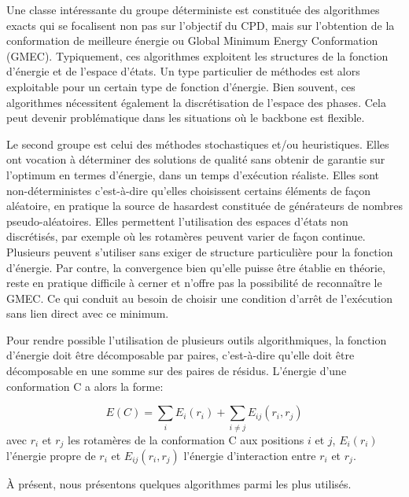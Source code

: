 Une classe intéressante du groupe déterministe est constituée des algorithmes exacts qui se focalisent non pas sur l'objectif du CPD, mais sur l'obtention de la conformation de meilleure énergie ou \og Global Minimum Energy Conformation \fg (GMEC). Typiquement, ces algorithmes exploitent les structures de la fonction d'énergie et de l'espace d'états. Un type particulier de méthodes est alors exploitable pour un certain type de fonction d'énergie. Bien souvent, ces algorithmes nécessitent également la discrétisation de l'espace des phases. Cela peut devenir problématique dans les situations où le backbone est flexible.
  
Le second groupe est celui des méthodes stochastiques et/ou heuristiques. Elles ont vocation à déterminer des solutions de qualité sans obtenir de garantie sur l'optimum en termes d'énergie, dans un temps d'exécution réaliste. Elles sont non-déterministes c'est-à-dire qu'elles choisissent certains éléments de façon aléatoire, en pratique la \og source de hasard\fg est constituée de générateurs de nombres pseudo-aléatoires. Elles permettent l'utilisation des espaces d'états non discrétisés, par exemple \cite{Perry12} où les rotamères peuvent varier de façon continue. Plusieurs peuvent s'utiliser sans exiger de structure particulière pour la fonction d'énergie. Par contre, la convergence bien qu'elle puisse être établie en théorie, reste en pratique difficile à cerner et n'offre pas la possibilité de reconnaître le GMEC. Ce qui conduit au besoin de choisir une condition d'arrêt de l'exécution sans lien direct avec ce minimum.  

Pour rendre possible l'utilisation de plusieurs outils algorithmiques, la fonction d'énergie doit être décomposable par paires, c'est-à-dire qu'elle doit être décomposable en une somme sur des paires de résidus. L'énergie d'une conformation C a alors la forme:

\begin{equation}
  \label{eq:pairwise}
E(C) = \sum_i E_i(r_i) + \sum_{i\neq j} E_{ij}(r_i,r_j)
\end{equation}
avec $r_i$ et $r_j$ les rotamères de la conformation C aux positions $i$ et $j$, $E_i(r_i)$ l'énergie propre de $r_i$ et $E_{ij}(r_i,r_j)$ l'énergie d'interaction entre $r_i$ et $r_j$.

À présent, nous présentons quelques algorithmes parmi les plus utilisés.

